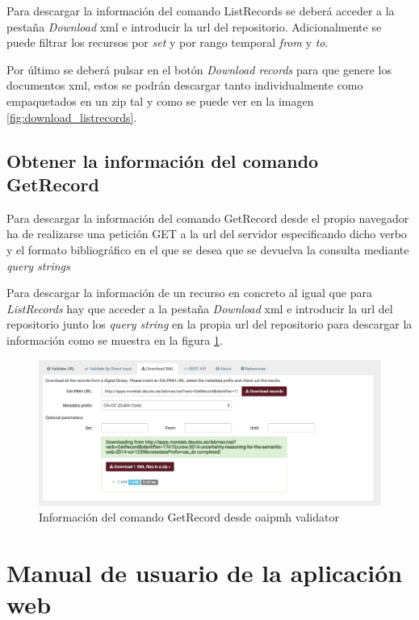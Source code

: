 Para descargar la información del comando ListRecords se deberá acceder a la pestaña \textit{Download} \acrshort{xml} e introducir la \acrshort{url} del repositorio. Adicionalmente se puede filtrar los recursos por \textit{set} y por rango temporal \textit{from} y \textit{to}.

Por último se deberá pulsar en el botón \textit{Download records} para que genere los documentos \acrshort{xml}, estos se podrán descargar tanto individualmente como empaquetados en un zip tal y como se puede ver en la imagen \ref{fig:download_listrecords}.

\subsection{Obtener la información del comando GetRecord}

Para descargar la información del comando GetRecord desde el propio navegador ha de realizarse una petición GET a la \acrshort{url} del servidor especificando dicho verbo y el formato bibliográfico en el que se desea que se devuelva la consulta mediante \textit{query strings}

Para descargar la información de un recurso en concreto al igual que para \textit{ListRecords} hay que acceder a la pestaña \textit{Download} \acrshort{xml} e introducir la url del repositorio junto los \textit{query string} en la propia \acrshort{url} del repositorio para descargar la información como se muestra en la figura \ref{fig:download_getrecord}.

\begin{figure}[!htbp]
	\centering
	\includegraphics[scale=0.31]{fig/download_oai/download_getrecord}
	\caption{Información del comando GetRecord desde \acrshort{oaipmh} validator}
	\label{fig:download_getrecord}
\end{figure}

\section{Manual de usuario de la aplicación web}

